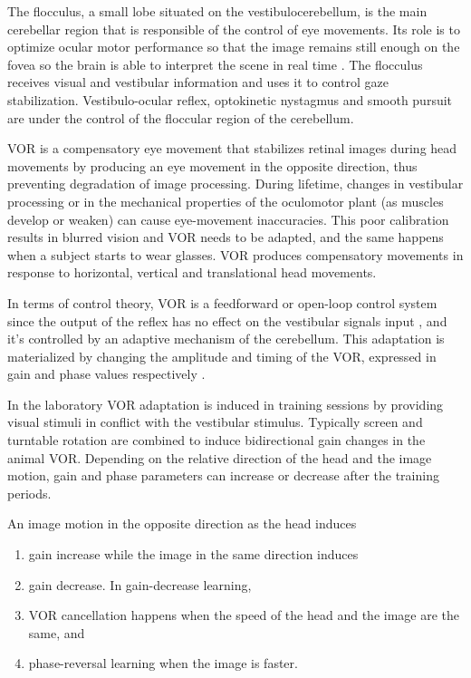\documentclass[12pt, a4paper,twoside]{tesi_upf}
\begin{document}
The flocculus, a small lobe situated on the vestibulocerebellum, is the main cerebellar region that is responsible of the control of eye movements. Its role is to optimize ocular motor performance so that the image remains still enough on the fovea so the brain is able to interpret the scene in real time \cite{Kheradmand2011}. The flocculus receives visual and vestibular information and uses it to control gaze stabilization. Vestibulo-ocular reflex, optokinetic nystagmus and smooth pursuit are under the control of the floccular region of the cerebellum.

VOR is a compensatory eye movement that stabilizes retinal images during head movements by producing an eye movement in the opposite direction, thus preventing degradation of image processing. During lifetime, changes in vestibular processing or in the mechanical properties of the oculomotor plant (as muscles develop or weaken) can cause eye-movement inaccuracies. This poor calibration results in blurred vision and VOR needs to be adapted, and the same happens when a subject starts to wear glasses. VOR produces compensatory movements in response to horizontal, vertical and translational head movements.

In terms of control theory, VOR is a feedforward or open-loop control system since the output of the reflex has no effect on the vestibular signals input \cite{Porrill2007}, and it's controlled by an adaptive mechanism of the cerebellum. This adaptation is materialized by changing the amplitude and timing of the VOR, expressed in gain and phase values respectively \cite{DeZeeuw2005}.

In the laboratory VOR adaptation is induced in training sessions by providing visual stimuli in conflict with the vestibular stimulus. Typically screen and turntable rotation are combined to induce bidirectional gain changes in the animal VOR. Depending on the relative direction of the head and the image motion, gain and phase parameters can increase or decrease after the training periods.

An image motion in the opposite direction as the head induces
\begin{enumerate}
\item gain increase while the image in the same direction induces
\item gain decrease. In gain-decrease learning,
\item VOR cancellation happens when the speed of the head and the image are the same, and
\item phase-reversal learning when the image is faster.   
\end{enumerate}
\end{document}
